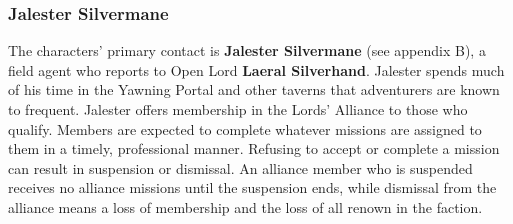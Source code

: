 \documentclass[10pt,a4paper,twoside,twocolumn,openany,nodeprecatedcode]{dndbook}
\begin{document}
\subsubsection{Jalester Silvermane}
The characters' primary contact is \textbf{Jalester Silvermane} (see appendix B), a field agent who reports to Open Lord \textbf{Laeral Silverhand}. Jalester spends much of his time in the Yawning Portal and other taverns that adventurers are known to frequent.
Jalester offers membership in the Lords' Alliance to those who qualify. Members are expected to complete whatever missions are assigned to them in a timely, professional manner. Refusing to accept or complete a mission can result in suspension or dismissal. An alliance member who is suspended receives no alliance missions until the suspension ends, while dismissal from the alliance means a loss of membership and the loss of all renown in the faction.
\end{document}
